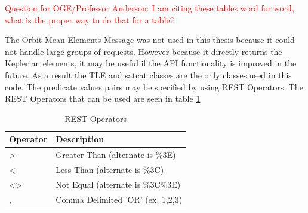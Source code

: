 \documentclass[12pt]{article}
\begin{document}
\textcolor{red}{Question for OGE/Professor Anderson: I am citing these tables word for word, what is the proper way to do that for a table?}

The Orbit Mean-Elements Message was not used in this thesis because it could not handle large groups of requests. However because it directly returns the Keplerian elements, it may be useful if the API functionality is improved in the future. As a result the TLE and satcat classes are the only classes used in this code. The predicate values pairs may be specified by using REST Operators. The REST Operators that can be used are seen in table \ref{tab:restOP}

\begin{table}[H]\singlespacing
	\caption{REST Operators\cite{SpaceTrackAPI}}
	\label{tab:restOP}
	\begin{tabular}{|l|p{13.5cm}|}
		\hline
		Operator                  & Description                                                                                                                                                                                                                                                                         \\ \hline
		\textgreater{}            & Greater Than (alternate is \%3E)                                                                                                                                                                                                                                                    \\ \hline
		\textless{}               & Less Than (alternate is \%3C)                                                                                                                                                                                                                                                       \\ \hline
		\textless{}\textgreater{} & Not Equal (alternate is \%3C\%3E)                                                                                                                                                                                                                                                   \\ \hline
		,                         & Comma Delimited 'OR' (ex. 1,2,3)                                                                                                                                                                                                                                                    \\ \hline

\end{tabular}
\end{table}
\end{document}

